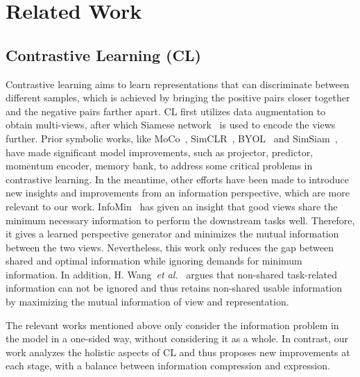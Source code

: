 \documentclass[10pt,twocolumn,letterpaper]{article}
\begin{document}
\section{Related Work}
\label{sec:rela}
\subsection{Contrastive Learning (CL)}
Contrastive learning aims to learn representations that can discriminate between different samples, which is achieved by bringing the positive pairs closer together and the negative pairs farther apart. CL first utilizes data augmentation to obtain multi-views, after which Siamese network~\cite{chen2021exploring,grill2020bootstrap} is used to encode the views further.
Prior symbolic works, like MoCo~\cite{he2020momentum,chen2020improved,chen2021empirical}, SimCLR~\cite{chen2020simple}, BYOL~\cite{grill2020bootstrap} and SimSiam~\cite{chen2021exploring}, have made significant model improvements, such as projector, predictor, momentum encoder, memory bank, to address some critical problems in contrastive learning. In the meantime, other efforts have been made to introduce new insights and improvements from an information perspective, which are more relevant to our work. InfoMin~\cite{tian2020makes} has given an insight that good views share the minimum necessary information to perform the downstream tasks well. Therefore, it gives a learned perspective generator and minimizes the mutual information between the two views. Nevertheless, this work only reduces the gap between shared and optimal information while ignoring demands for minimum information.
In addition, H. Wang~\textit{et al.}~\cite{wang2022rethinking} argues that non-shared task-related information can not be ignored and thus retains non-shared usable information by maximizing the mutual information of view and representation.

The relevant works mentioned above only consider the information problem in the model in a one-sided way, without considering it as a whole. In contrast, our work analyzes the holistic aspects of CL and thus proposes new improvements at each stage, with a balance between information compression and expression.
\end{document}
